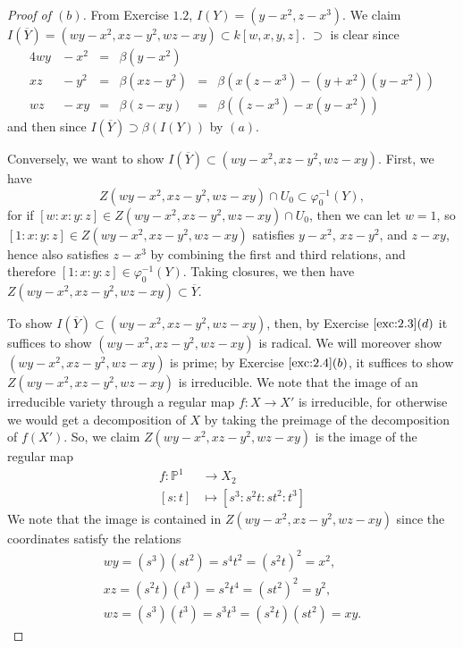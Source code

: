 \documentclass[12pt,letterpaper]{article}
\theoremstyle{definition}
\theoremstyle{remark}
\numberwithin{equation}{section}
\numberwithin{figure}{problem}
\begin{document}
\begin{proof}[Proof of $(b)$]
  From Exercise $1.2$, $I(Y) = (y-x^2, z-x^3)$.
  We claim $I(\overline{Y}) = (wy-x^2,xz-y^2,wz-xy) \subset k[w,x,y,z]$.
  $\supset$ is clear since
  \begin{alignat*}{4}
    wy &{}- x^2 &{}={}& \beta(y-x^2)\\
    xz &{}- y^2 &{}={}& \beta(xz-y^2) &{}={}& \beta(x(z-x^3)-(y+x^2)(y-x^2))\\
    wz &{}- xy  &{}={}& \beta(z-xy)   &{}={}& \beta((z-x^3) - x(y-x^2))
  \end{alignat*}
  and then since $I(\overline{Y}) \supset \beta(I(Y))$ by $(a)$.
  \par Conversely, we want to show $I(\overline{Y}) \subset
  (wy-x^2,xz-y^2,wz-xy)$. First, we have
  \begin{equation*}
    Z(wy-x^2,xz-y^2,wz-xy) \cap U_0 \subset \varphi_0^{-1}(Y),
  \end{equation*}
  for if $[w:x:y:z] \in Z(wy-x^2,xz-y^2,wz-xy) \cap U_0$, then we can let $w=1$,
  so $[1:x:y:z] \in Z(wy-x^2,xz-y^2,wz-xy)$ satisfies $y-x^2$, $xz - y^2$, and
  $z - xy$, hence also satisfies $z - x^3$ by combining the first and third
  relations, and therefore $[1:x:y:z] \in 
  \varphi_0^{-1}(Y)$. Taking closures, we then have $Z(wy-x^2,xz-y^2,wz-xy)
  \subset \overline{Y}$.
  \par To show $I(\overline{Y}) \subset
  (wy-x^2,xz-y^2,wz-xy)$, then, by Exercise $\ref{exc:2.3}(d)$ it suffices to
  show $(wy-x^2,xz-y^2,wz-xy)$ is radical. We will moreover show
  $(wy-x^2,xz-y^2,wz-xy)$ is prime; by Exercise $\ref{exc:2.4}(b)$, it suffices
  to show $Z(wy-x^2,xz-y^2,wz-xy)$ is irreducible. We note that the image of an
  irreducible variety through a regular map $f\colon X \to X'$ is irreducible, for
  otherwise we would get a decomposition of $X$ by taking the preimage of the
  decomposition of $f(X')$. So, we claim $Z(wy-x^2,xz-y^2,wz-xy)$ is the image
  of the regular map
  \begin{align*}
    f\colon \mathbb{P}^1 &\to X_2\\
    [s:t] &\mapsto [s^3:s^2t:st^2:t^3]
  \end{align*}
  We note that the image is contained in $Z(wy-x^2,xz-y^2,wz-xy)$ since the
  coordinates satisfy the relations
  \begin{gather*}
    wy=(s^3)(st^2) = s^4t^2 = (s^2t)^2 = x^2,\\
    xz=(s^2t)(t^3) = s^2t^4 = (st^2)^2 = y^2,\\
    wz=(s^3)(t^3)=s^3t^3=(s^2t)(st^2)=xy.

\end{gather*}
\end{proof}
\end{document}
